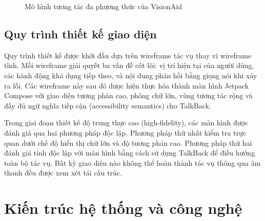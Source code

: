 \documentclass[a4paper,13pt]{report}
\begin{document}
\begin{figure}[H]
    \centering
    \caption{Mô hình tương tác đa phương thức của VisionAid}
\end{figure}

\section{Quy trình thiết kế giao diện}

Quy trình thiết kế được khởi đầu dựa trên wireframe tác vụ thay vì wireframe tĩnh. Mỗi wireframe giải quyết ba vấn đề cốt lõi: vị trí hiện tại của người dùng, các hành động khả dụng tiếp theo, và nội dung phản hồi bằng giọng nói khi xảy ra lỗi. Các wireframe này sau đó được hiện thực hóa thành màn hình Jetpack Compose với giao diện tương phản cao, phông chữ lớn, vùng tương tác rộng và đầy đủ ngữ nghĩa tiếp cận (accessibility semantics) cho TalkBack.

Trong giai đoạn thiết kế độ trung thực cao (high-fidelity), các màn hình được đánh giá qua hai phương pháp độc lập. Phương pháp thứ nhất kiểm tra trực quan dưới chế độ hiển thị chữ lớn và độ tương phản cao. Phương pháp thứ hai đánh giá tính độc lập với màn hình bằng cách sử dụng TalkBack để điều hướng toàn bộ tác vụ. Bất kỳ giao diện nào không thể hoàn thành tác vụ thông qua âm thanh đều được xem xét tái cấu trúc.



\chapter{Kiến trúc hệ thống và công nghệ}
\end{document}
